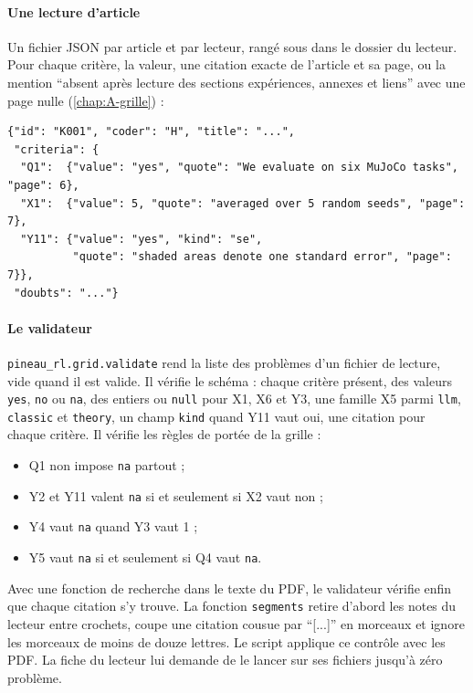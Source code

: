 \paragraph{Une lecture d'article} Un fichier JSON par article et par lecteur, rangé
sous  dans le dossier du lecteur. Pour chaque critère, la valeur, une citation exacte de
l'article et sa page, ou la mention \enquote{absent après lecture des sections expériences, annexes
et liens} avec une page nulle (\cref{chap:A-grille}) :
\begin{lstlisting}
{"id": "K001", "coder": "H", "title": "...",
 "criteria": {
  "Q1":  {"value": "yes", "quote": "We evaluate on six MuJoCo tasks", "page": 6},
  "X1":  {"value": 5, "quote": "averaged over 5 random seeds", "page": 7},
  "Y11": {"value": "yes", "kind": "se",
          "quote": "shaded areas denote one standard error", "page": 7}},
 "doubts": "..."}
\end{lstlisting}

\paragraph{Le validateur} \texttt{pineau\_rl.grid.validate} rend la liste des problèmes d'un fichier
de lecture, vide quand il est valide. Il vérifie le schéma : chaque critère présent, des valeurs
\texttt{yes}, \texttt{no} ou \texttt{na}, des entiers ou \texttt{null} pour X1, X6 et Y3, une famille
X5 parmi \texttt{llm}, \texttt{classic} et \texttt{theory}, un champ \texttt{kind} quand Y11 vaut oui,
une citation pour chaque critère. Il vérifie les règles de portée de la grille :
\begin{itemize}
  \item Q1 non impose \texttt{na} partout ;
  \item Y2 et Y11 valent \texttt{na} si et seulement si X2 vaut non ;
  \item Y4 vaut \texttt{na} quand Y3 vaut 1 ;
  \item Y5 vaut \texttt{na} si et seulement si Q4 vaut \texttt{na}.
\end{itemize}
Avec une fonction de recherche dans le texte du PDF, le validateur vérifie enfin que chaque citation
s'y trouve. La
fonction \texttt{segments} retire d'abord les notes du lecteur entre crochets, coupe une citation
cousue par \enquote{[...]} en morceaux et ignore les morceaux de moins de douze lettres. Le script
 applique ce contrôle avec les PDF. La fiche du lecteur lui demande de
le lancer sur ses fichiers jusqu'à zéro problème.

